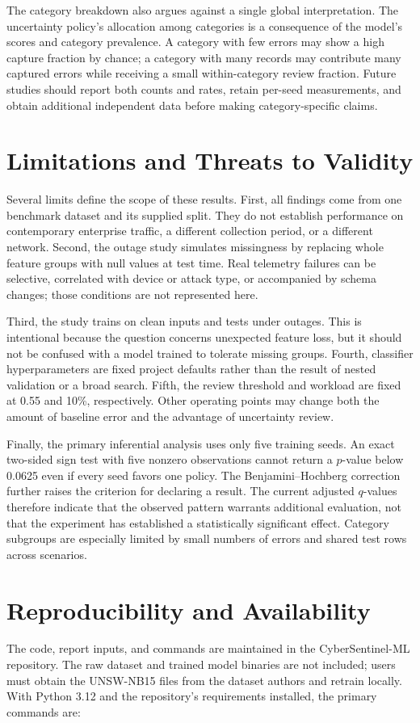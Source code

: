 \documentclass[conference]{IEEEtran}
\begin{document}
The category breakdown also argues against a single global interpretation. The uncertainty policy's allocation among categories is a consequence of the model's scores and category prevalence. A category with few errors may show a high capture fraction by chance; a category with many records may contribute many captured errors while receiving a small within-category review fraction. Future studies should report both counts and rates, retain per-seed measurements, and obtain additional independent data before making category-specific claims.

\section{Limitations and Threats to Validity}
Several limits define the scope of these results. First, all findings come from one benchmark dataset and its supplied split. They do not establish performance on contemporary enterprise traffic, a different collection period, or a different network. Second, the outage study simulates missingness by replacing whole feature groups with null values at test time. Real telemetry failures can be selective, correlated with device or attack type, or accompanied by schema changes; those conditions are not represented here.

Third, the study trains on clean inputs and tests under outages. This is intentional because the question concerns unexpected feature loss, but it should not be confused with a model trained to tolerate missing groups. Fourth, classifier hyperparameters are fixed project defaults rather than the result of nested validation or a broad search. Fifth, the review threshold and workload are fixed at 0.55 and 10\%, respectively. Other operating points may change both the amount of baseline error and the advantage of uncertainty review.

Finally, the primary inferential analysis uses only five training seeds. An exact two-sided sign test with five nonzero observations cannot return a $p$-value below 0.0625 even if every seed favors one policy. The Benjamini--Hochberg correction further raises the criterion for declaring a result. The current adjusted $q$-values therefore indicate that the observed pattern warrants additional evaluation, not that the experiment has established a statistically significant effect. Category subgroups are especially limited by small numbers of errors and shared test rows across scenarios.

\section{Reproducibility and Availability}
The code, report inputs, and commands are maintained in the CyberSentinel-ML repository. The raw dataset and trained model binaries are not included; users must obtain the UNSW-NB15 files from the dataset authors and retrain locally. With Python 3.12 and the repository's requirements installed, the primary commands are:
\end{document}
